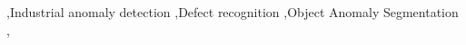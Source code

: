 \documentclass[a4paper,fleqnn]{cas-sc}
\begin{document}
\begin{keywords}
 \sep Industrial anomaly detection \sep  Defect recognition \sep Object Anomaly Segmentation \sep
\end{keywords}

\maketitle


 
%

%

%









\end{document}

